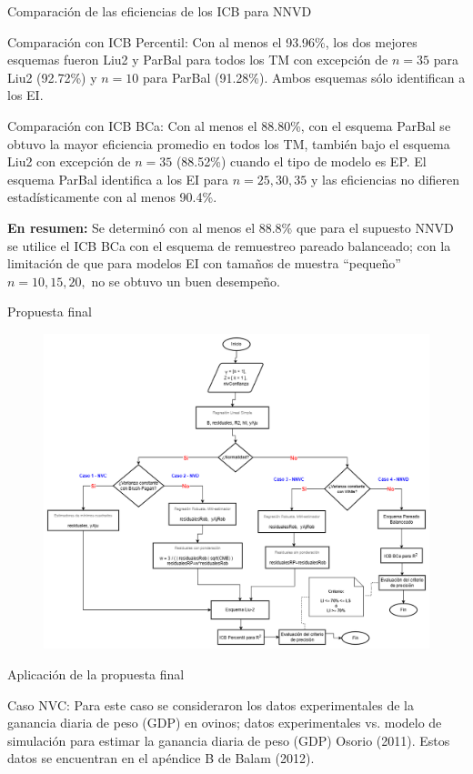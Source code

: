\documentclass[serif, aspectratio=169]{beamer}
\begin{document}
\begin{frame}{Comparación de las eficiencias de los ICB para NNVD}
	\begin{exampleblock}{Comparación con ICB Percentil:}
	Con al menos el 93.96\%, los dos mejores esquemas fueron Liu2 y ParBal para todos los TM con excepción de $n=35$ para Liu2 (92.72\%) y $n=10$ para ParBal (91.28\%). Ambos esquemas sólo identifican a los EI.
	\end{exampleblock}
	
	\begin{exampleblock}{Comparación con ICB BCa:}
	Con al menos el 88.80\%, con el esquema ParBal se obtuvo la mayor eficiencia promedio en todos los TM, también bajo el esquema Liu2 con excepción de $n=35$ (88.52\%) cuando el tipo de modelo es EP. El esquema ParBal identifica a los EI para $n= 25, 30, 35$ y las eficiencias no difieren estadísticamente con al menos 90.4\%.
	\vspace{.1cm}
	
	\textbf{En resumen:}
	Se determinó con al menos el 88.8\% que para el supuesto NNVD se utilice el ICB BCa con el esquema de remuestreo pareado balanceado; con la limitación de que para modelos EI con tamaños de muestra “pequeño” $n=10, 15, 20,$ no se obtuvo un buen desempeño.
	\end{exampleblock}
\end{frame}


\begin{frame}{Propuesta final}
	\begin{figure}[ht] 
		\centering 
		\includegraphics[width=0.62\linewidth]{recurso/finalPresent.png} 
		\label{fig:finalPropuesta}
	\end{figure}
\end{frame}


\begin{frame}{Aplicación de la propuesta final}
	\begin{exampleblock}{Caso NVC:}
		Para este caso se consideraron los datos experimentales de la ganancia diaria de peso (GDP) en ovinos; datos experimentales vs. modelo de simulación para estimar la ganancia diaria de peso (GDP) Osorio (2011). Estos datos se encuentran en el apéndice B de Balam (2012).
	\end{exampleblock}
\end{frame}
\end{document}
